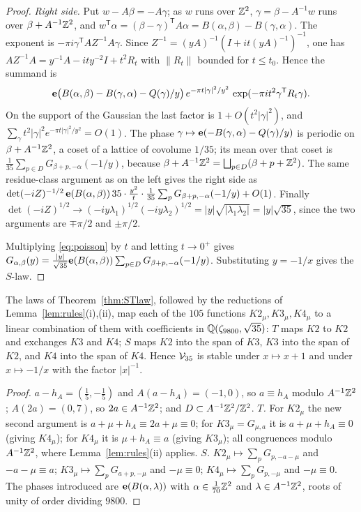 \begin{proof}
\emph{Right side.} Put $w-A\beta=-A\gamma$; as $w$ runs over $\mathbb{Z}^2$, $\gamma=\beta-A^{-1}w$ runs over $\beta+A^{-1}\mathbb{Z}^2$, and
$w^{\mathsf T}\alpha=(\beta-\gamma)^{\mathsf T}A\alpha=B(\alpha,\beta)-B(\gamma,\alpha)$. The exponent is $-\pi i\gamma^{\mathsf T}AZ^{-1}A\gamma$.
Since $Z^{-1}=(yA)^{-1}(I+it(yA)^{-1})^{-1}$, one has $AZ^{-1}A=y^{-1}A-ity^{-2}I+t^2R_t$ with $\|R_t\|$ bounded for $t\le t_0$. Hence the summand is
\[
\mathbf{e}\bigl(B(\alpha,\beta)-B(\gamma,\alpha)-Q(\gamma)/y\bigr)\,e^{-\pi t|\gamma|^2/y^2}\,\exp(-\pi i t^2\gamma^{\mathsf T}R_t\gamma).
\]
On the support of the Gaussian the last factor is $1+O(t^2|\gamma|^2)$, and $\sum_\gamma t^2|\gamma|^2e^{-\pi t|\gamma|^2/y^2}=O(1)$.
The phase $\gamma\mapsto\mathbf{e}(-B(\gamma,\alpha)-Q(\gamma)/y)$ is periodic on $\beta+A^{-1}\mathbb{Z}^2$, a coset of a lattice of covolume $1/35$; its mean over
that coset is $\frac1{35}\sum_{p\in D}G_{\beta+p,-\alpha}(-1/y)$, because $\beta+A^{-1}\mathbb{Z}^2=\bigsqcup_{p\in D}(\beta+p+\mathbb{Z}^2)$. The same residue-class
argument as on the left gives the right side as
$\det(-iZ)^{-1/2}\,\mathbf{e}(B(\alpha,\beta))\,35\cdot\frac{y^2}{t}\cdot\frac1{35}\sum_pG_{\beta+p,-\alpha}(-1/y)+O(1)$.
Finally $\det(-iZ)^{1/2}\to(-iy\lambda_1)^{1/2}(-iy\lambda_2)^{1/2}=|y|\sqrt{|\lambda_1\lambda_2|}=|y|\sqrt{35}$, since the two
arguments are $\mp\pi/2$ and $\pm\pi/2$.

Multiplying \eqref{eq:poisson} by $t$ and letting $t\to0^+$ gives
$G_{\alpha,\beta}(y)=\frac{|y|}{\sqrt{35}}\mathbf{e}(B(\alpha,\beta))\sum_{p\in D}G_{\beta+p,-\alpha}(-1/y)$. Substituting $y=-1/x$ gives the $S$-law.
\end{proof}

\begin{proposition}[Closure]\label{prop:closure}
The laws of Theorem~\ref{thm:STlaw}, followed by the reductions of Lemma~\ref{lem:rules}(i),(ii), map each of the $105$ functions
$K2_\mu,K3_\mu,K4_\mu$ to a linear combination of them with coefficients in $\mathbb{Q}(\zeta_{9800},\sqrt{35})$: $T$ maps $K2$ to $K2$ and exchanges
$K3$ and $K4$; $S$ maps $K2$ into the span of $K3$, $K3$ into the span of $K2$, and $K4$ into the span of $K4$. Hence $\mathcal V_{35}$ is stable under
$x\mapsto x+1$ and under $x\mapsto-1/x$ with the factor $|x|^{-1}$.
\end{proposition}
\begin{proof}
$a-h_A=(\tfrac15,-\tfrac15)$ and $A(a-h_A)=(-1,0)$, so $a\equiv h_A$ modulo $A^{-1}\mathbb{Z}^2$; $A(2a)=(0,7)$, so $2a\in A^{-1}\mathbb{Z}^2$; and $D\subset A^{-1}\mathbb{Z}^2/\mathbb{Z}^2$.
\emph{$T$.} For $K2_\mu$ the new second argument is $a+\mu+h_A\equiv 2a+\mu\equiv0$; for $K3_\mu=G_{\mu,a}$ it is $a+\mu+h_A\equiv0$ (giving $K4_\mu$);
for $K4_\mu$ it is $\mu+h_A\equiv a$ (giving $K3_\mu$); all congruences modulo $A^{-1}\mathbb{Z}^2$, where Lemma~\ref{lem:rules}(ii) applies.
\emph{$S$.} $K2_\mu\mapsto\sum_pG_{p,-a-\mu}$ and $-a-\mu\equiv a$; $K3_\mu\mapsto\sum_pG_{a+p,-\mu}$ and $-\mu\equiv0$; $K4_\mu\mapsto\sum_pG_{p,-\mu}$ and $-\mu\equiv0$.
The phases introduced are $\mathbf{e}(B(\alpha,\lambda))$ with $\alpha\in\frac1{70}\mathbb{Z}^2$ and $\lambda\in A^{-1}\mathbb{Z}^2$, roots of unity of order dividing $9800$.
\end{proof}

